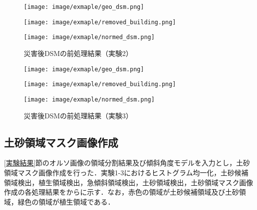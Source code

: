       \begin{figure}[t]
        \begin{minipage}[c]{0.329\hsize}
          \centering
          \texttt{[image: image/exmaple/geo\_dsm.png]}
        \end{minipage}
        \begin{minipage}[c]{0.329\hsize}
          \centering
          \texttt{[image: image/exmaple/removed\_building.png]}
        \end{minipage}
        \begin{minipage}[c]{0.329\hsize}
          \centering
          \texttt{[image: image/exmaple/normed\_dsm.png]}
        \end{minipage}
        \caption{災害後DSMの前処理結果（実験2）}
      \end{figure}

      \begin{figure}[t]
        \begin{minipage}[c]{0.329\hsize}
          \centering
          \texttt{[image: image/exmaple/geo\_dsm.png]}
        \end{minipage}
        \begin{minipage}[c]{0.329\hsize}
          \centering
          \texttt{[image: image/exmaple/removed\_building.png]}
        \end{minipage}
        \begin{minipage}[c]{0.329\hsize}
          \centering
          \texttt{[image: image/exmaple/normed\_dsm.png]}
        \end{minipage}
        \caption{災害後DSMの前処理結果（実験3）}
        \label{災害後DSMの前処理結果（実験3）}
      \end{figure}


    \subsection*{土砂領域マスク画像作成}
      \ref{実験結果}節のオルソ画像の領域分割結果及び傾斜角度モデルを入力とし，土砂領域マスク画像作成を行った．実験1-3におけるヒストグラム均一化，土砂候補領域検出，植生領域検出，急傾斜領域検出，土砂領域検出，土砂領域マスク画像作成の各処理結果をからに示す．なお，赤色の領域が土砂候補領域及び土砂領域，緑色の領域が植生領域である．


